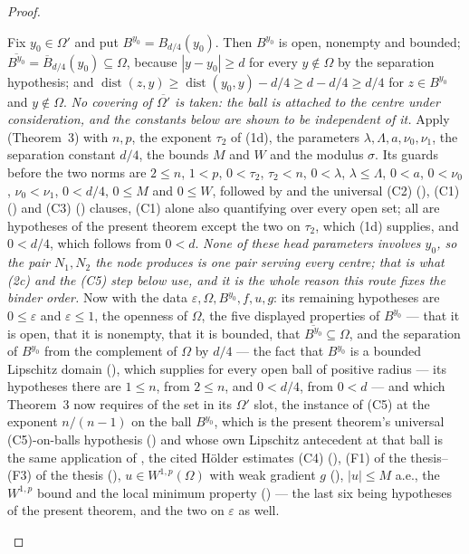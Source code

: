 \begin{proof}
\begin{enumerate}
  Fix $y_0\in\Omega'$ and put
  $B^{y_0}=B_{d/4}(y_0)$.  Then $B^{y_0}$ is
  open, nonempty and bounded; $\overline{B^{y_0}}=\overline B_{d/4}(y_0)
  \subseteq\Omega$, because $|y-y_0|\ge d$ for every $y\notin\Omega$ by the
  separation hypothesis; and
  $\operatorname{dist}(z,y)\ge\operatorname{dist}(y_0,y)-d/4\ge
  d-d/4\ge d/4$ for $z\in B^{y_0}$ and $y\notin\Omega$.  \emph{No covering of
  $\overline{\Omega'}$ is taken: the ball is attached to the centre under
  consideration, and the constants below are shown to be independent of it.}
  Apply
   (Theorem~3) with $n,p$, the exponent
  $\tau_2$ of (1d), the parameters
  $\lambda,\Lambda,a,\nu_0,\nu_1$, the separation constant $d/4$, the bounds
  $M$ and $W$ and the modulus $\sigma$.  Its guards before the two norms are
  $2\le n$, $1<p$, $0<\tau_2$, $\tau_2<n$, $0<\lambda$, $\lambda\le\Lambda$,
  $0<a$, $0<\nu_0$, $\nu_0<\nu_1$, $0<d/4$, $0\le M$ and $0\le W$, followed by
   and the universal (C2)
  (), (C1) () and (C3)
  () clauses, (C1) alone also quantifying over
  every open set; all are hypotheses of the present theorem except the two on
  $\tau_2$, which (1d) supplies, and $0<d/4$, which follows from $0<d$.
  \emph{None of these head parameters involves $y_0$, so the pair $N_1,N_2$ the
  node produces is one pair serving every centre; that is what (2c) and the
  \textup{(C5)} step below use, and it is the whole reason this route fixes the
  binder order.}
  Now with the data
  $\varepsilon,\Omega,B^{y_0},f,u,g$: its remaining hypotheses are $0\le\varepsilon$
  and $\varepsilon\le1$, the openness of
  $\Omega$, the five displayed properties of $B^{y_0}$ --- that it is open, that it
  is nonempty, that it is bounded, that $\overline{B^{y_0}}\subseteq\Omega$, and the
  separation of $B^{y_0}$ from the complement of $\Omega$ by $d/4$ --- the fact that $B^{y_0}$ is a bounded Lipschitz domain
  (), which 
  supplies for every open ball of positive radius --- its hypotheses there are
  $1\le n$, from $2\le n$, and $0<d/4$, from $0<d$ --- and which Theorem~3 now
  requires of the set in its $\Omega'$ slot, the instance
  of (C5) at the
  exponent $n/(n-1)$ on the ball $B^{y_0}$, which is the present theorem's
  universal (C5)-on-balls hypothesis () and
  whose own Lipschitz antecedent at that ball is the same application of
  , the
  cited H\"older estimates (C4) (),
  (F1) of the thesis--(F3) of the thesis (),
  $u\in W^{1,p}(\Omega)$ with weak gradient $g$ (),
  $|u|\le M$ a.e., the $W^{1,p}$ bound and the local minimum property
  () --- the last six being hypotheses of the present
  theorem, and the two on $\varepsilon$ as well.


\end{enumerate}
\end{proof}
